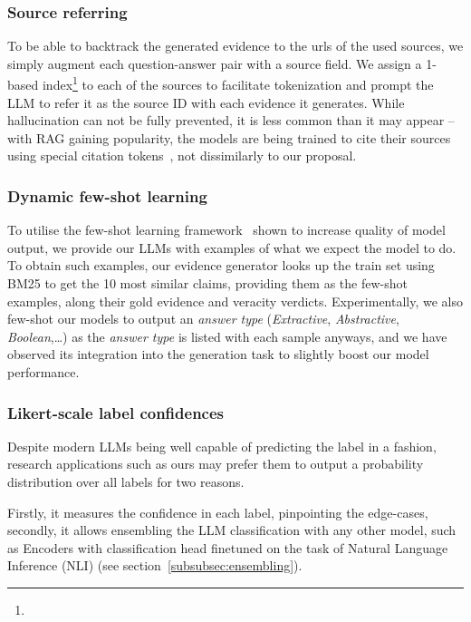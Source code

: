 \subsubsection{Source referring}
To be able to backtrack the generated evidence to the urls of the used sources, we simply augment each question-answer pair with a source field.
We assign a 1-based index\footnote{}  to each of the sources to facilitate tokenization and prompt the LLM to refer it as the source ID with each evidence it generates.
While hallucination can not be fully prevented, it is less common than it may appear -- with RAG gaining popularity, the models are being trained to cite their sources using special citation tokens~\cite{menick2022teachinglanguagemodelssupport}, not dissimilarly to our proposal.

\subsubsection{Dynamic few-shot learning}
To utilise the few-shot learning framework~\cite{fewshot} shown to increase quality of model output, we provide our LLMs with examples of what we expect the model to do.
To obtain such examples, our evidence generator looks up the \averitec{} train set using BM25 to get the 10 most similar claims, providing them as the few-shot examples, along their gold evidence and veracity verdicts.
Experimentally, we also few-shot our models to output an \textit{answer type} (\textit{Extractive}, \textit{Abstractive}, \textit{Boolean},\dots) as the \textit{answer type} is listed with each sample anyways, and we have observed its integration into the generation task to slightly boost our model performance.

\subsubsection{Likert-scale label confidences}
\label{likert}
Despite modern LLMs being well capable of predicting the label in a  fashion, research applications such as ours may prefer them to output a probability distribution over all labels for two reasons.

Firstly, it measures the confidence in each label, pinpointing the edge-cases, secondly, it allows ensembling the LLM classification with any other model, such as Encoders with classification head finetuned on the task of Natural Language Inference (NLI) (see section~\ref{subsubsec:ensembling}).

